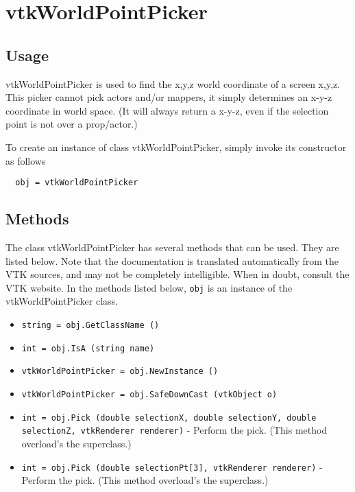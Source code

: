\section{vtkWorldPointPicker}

\subsection{Usage}

 vtkWorldPointPicker is used to find the x,y,z world coordinate of a
 screen x,y,z. This picker cannot pick actors and/or mappers, it
 simply determines an x-y-z coordinate in world space. (It will always
 return a x-y-z, even if the selection point is not over a prop/actor.)

To create an instance of class vtkWorldPointPicker, simply
invoke its constructor as follows
\begin{verbatim}
  obj = vtkWorldPointPicker
\end{verbatim}
\subsection{Methods}

The class vtkWorldPointPicker has several methods that can be used.
  They are listed below.
Note that the documentation is translated automatically from the VTK sources,
and may not be completely intelligible.  When in doubt, consult the VTK website.
In the methods listed below, \verb|obj| is an instance of the vtkWorldPointPicker class.
\begin{itemize}
\item  \verb|string = obj.GetClassName ()|

\item  \verb|int = obj.IsA (string name)|

\item  \verb|vtkWorldPointPicker = obj.NewInstance ()|

\item  \verb|vtkWorldPointPicker = obj.SafeDownCast (vtkObject o)|

\item  \verb|int = obj.Pick (double selectionX, double selectionY, double selectionZ, vtkRenderer renderer)| -  Perform the pick. (This method overload's the superclass.)

\item  \verb|int = obj.Pick (double selectionPt[3], vtkRenderer renderer)| -  Perform the pick. (This method overload's the superclass.)

\end{itemize}
